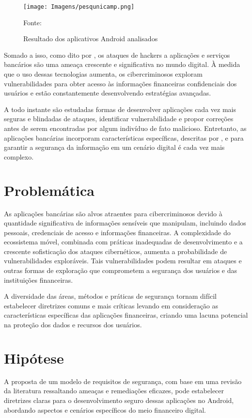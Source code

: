     \begin{figure}[H]
    \centering 
    \texttt{[image: Imagens/pesqunicamp.png]}
    \caption{Resultado dos aplicativos Android analisados}
    \label{PesquisaUnicamp}
    Fonte: 
    \end{figure}

    Somado a isso, como dito por , os ataques de hackers a aplicações e serviços bancários são uma ameaça crescente e significativa no mundo digital. À medida que o uso dessas tecnologias aumenta, os cibercriminosos exploram vulnerabilidades para obter acesso às informações financeiras confidenciais dos usuários e estão constantemente desenvolvendo estratégias avançadas.
    
    A todo instante são estudadas formas de desenvolver aplicações cada vez mais seguras e blindadas de ataques, identificar vulnerabilidade e propor correções antes de serem encontradas por algum indivíduo de fato malicioso. Entretanto, as aplicações bancárias incorporam características específicas, descritas por , e para garantir a segurança da informação em um cenário digital é cada vez mais complexo. 
         
    
    \section{Problemática}
    As aplicações bancárias são alvos atraentes para cibercriminosos devido à quantidade significativa de informações sensíveis que manipulam, incluindo dados pessoais, credenciais de acesso e informações financeiras. A complexidade do ecossistema móvel, combinada com práticas inadequadas de desenvolvimento e a crescente sofisticação dos ataques cibernéticos, aumenta a probabilidade de vulnerabilidades exploráveis. Tais vulnerabilidades podem resultar em ataques e outras formas de exploração que comprometem a segurança dos usuários e das instituições financeiras.
    
    A diversidade das áreas, métodos e práticas de segurança tornam difícil estabelecer diretrizes comuns e mais críticas levando em consideração as características específicas das aplicações financeiras, criando uma lacuna potencial na proteção dos dados e recursos dos usuários. 
    
    \section{Hipótese}
    A proposta de um modelo de requisitos de segurança, com base em uma revisão da literatura ressaltando ameaças e remediações eficazes, pode estabelecer diretrizes claras para o desenvolvimento seguro dessas aplicações no Android, abordando aspectos e cenários específicos do meio financeiro digital.
    
